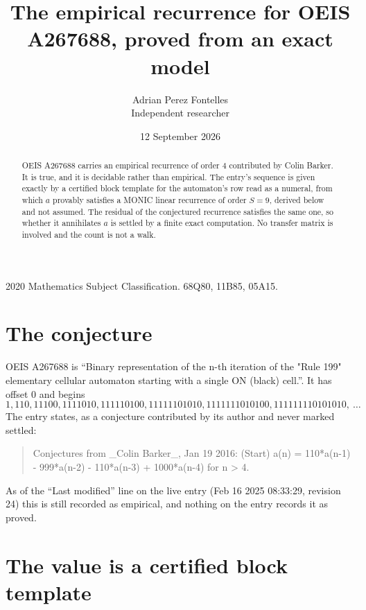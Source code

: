 \documentclass[11pt,a4paper]{article}
\title{The empirical recurrence for OEIS A267688, proved from an exact model}
\author{Adrian Perez Fontelles\\ \small Independent researcher}
\date{12 September 2026}
\theoremstyle{plain}
\theoremstyle{definition}
\begin{document}
\maketitle

\begin{abstract}
OEIS A267688 carries an empirical recurrence of order $4$ contributed by Colin Barker. It is true, and it is
decidable rather than empirical. The entry's sequence is given exactly by a certified block template for the automaton's row read as a numeral, from
which $a$ provably satisfies a MONIC linear recurrence of order $S=9$, derived below and not
assumed. The residual of the conjectured recurrence satisfies the same one, so whether it
annihilates $a$ is settled by a finite exact computation. No transfer matrix is involved and
the count is not a walk.
\end{abstract}

\noindent\small 2020 Mathematics Subject Classification. 68Q80, 11B85, 05A15.\normalsize

\section{The conjecture}

OEIS A267688 is ``Binary representation of the n-th iteration of the "Rule 199" elementary cellular automaton starting with a single ON (black) cell.''. It has offset $0$ and begins
\[
1, 110, 11100, 1111010, 111110100, 11111101010, 1111111010100, 111111110101010,\ \dots
\]
The entry states, as a conjecture contributed by its author and never marked settled:
\begin{quote}
Conjectures from \_Colin Barker\_, Jan 19 2016: (Start) a(n) = 110*a(n-1) - 999*a(n-2) - 110*a(n-3) + 1000*a(n-4) for n > 4.
\end{quote}
As of the ``Last modified'' line on the live entry (Feb 16 2025 08:33:29, revision 24)
this is still recorded as empirical, and nothing on the entry records it as proved.

\section{The value is a certified block template}
\end{document}

